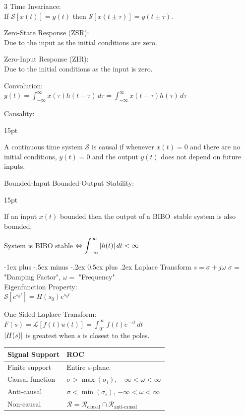 \documentclass[12pt,landscape,letterpaper]{article}
\makeatletter
\renewcommand{\section}{\@startsection{section}{1}{0mm}%
                                {-1ex plus -.5ex minus -.2ex}%
                                {0.5ex plus .2ex}%
                                {\normalfont\normalsize\bfseries}}
\newcommand{\tab}{\hspace{0.02\textwidth}}
\newcommand{\ds}{\displaystyle}
\newenvironment{tabbed}
{
\vspace{-\parskip}
\begin{adjustwidth}{15pt}{}
}
{\end{adjustwidth}}
\makeatother
\begin{document}
\begin{multicols*}{3}
Time Invariance:\\
\tab If $\mathcal{S}[x(t)] = y(t)$ then $\mathcal{S}[x(t \pm \tau)] = y(t \pm \tau)$.

Zero-State Response (ZSR):\\
\tab Due to the input as the initial conditions are zero.

Zero-Input Response (ZIR):\\
\tab Due to the initial conditions as the input is zero.

Convolution:\\
\tab $\ds y(t) = \int_{-\infty}^{\infty}x(\tau)h(t-\tau)\,d\tau = \int_{-\infty}^{\infty}x(t-\tau)h(\tau)\,d\tau$

Causality:\\
\begin{tabbed}
A continuous time system $\mathcal{S}$ is causal if whenever $x(t) = 0$ and there are no initial conditions, $y(t) = 0$ and the output $y(t)$ does not depend on future inputs.
\end{tabbed}

Bounded-Input Bounded-Output Stability:\\
\begin{tabbed}
If an input $x(t)$ bounded then the output of a BIBO~stable system is also bounded.
\end{tabbed}
\tab System is BIBO stable $\Leftrightarrow \ds \int_{-\infty}^{\infty} \abs{h(t)}\,dt < \infty$

\section{Laplace Transform}
$s = \sigma + j\omega$ \quad $\sigma = $ "Damping Factor", $\omega = $ "Frequency"\\

Eigenfunction Property:\\
\tab $\mathcal{S}[e^{s_0t}] = H(s_0)e^{s_0t}$

One Sided Laplace Transform:\\
\tab $\ds F(s) = \mathcal{L}[f(t)u(t)] = \int_{0^-}^{\infty}f(t)e^{-st}\,dt$\\
\tab $\abs{H(s)}$ is greatest when $s$ is closest to the poles. %

\begin{tabular}{ll}
	\toprule
	Signal Support & ROC\\
	\midrule
	Finite support & Entire s-plane.\\
	Causal function & $\sigma > \max(\sigma_i)$,  $-\infty < \omega < \infty$\\
	Anti-causal & $\sigma < \min(\sigma_i)$,  $-\infty < \omega < \infty$\\
	Non-causal & $\mathcal{R} = \mathcal{R}_\text{causal} \cap \mathcal{R}_\text{anti-causal}$\\
	\bottomrule
\end{tabular}
\vspace{0.5em}


\end{multicols*}
\end{document}
